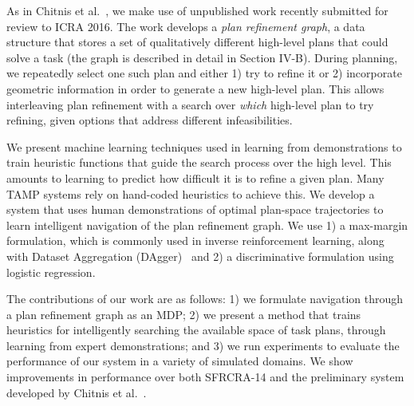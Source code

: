 As in Chitnis et al.~\cite{chitnis2015mlpc}, we make use of unpublished work
recently submitted for review to ICRA 2016. The work develops
a \emph{plan refinement graph}, a data structure that stores a
set of qualitatively different high-level plans that could solve a task (the graph is
described in detail in Section IV-B).
During planning, we repeatedly select one such plan and either 1) try to
refine it or 2) incorporate geometric information in order to generate a new high-level
plan. This allows interleaving plan refinement with a
search over \emph{which} high-level plan to try refining, given options
that address different infeasibilities.

We present machine learning techniques used in learning from demonstrations
to train heuristic functions that guide the search process over the high level.
This amounts to learning to predict how difficult it is to refine a given plan.
Many TAMP systems rely on hand-coded heuristics to achieve this. We develop a system that uses human
demonstrations of optimal plan-space trajectories to learn intelligent navigation
of the plan refinement graph. We use 1) a max-margin formulation, which is commonly used in inverse reinforcement learning, along with Dataset Aggregation (DAgger)~\cite{ross2010dagger} and 2) a discriminative formulation using logistic regression.

The contributions of our work are as follows: 1) we formulate navigation through a plan
refinement graph as an MDP; 2) we present a method that trains
heuristics for intelligently searching the available space of task plans, through learning
from expert demonstrations; and 3)
we run experiments to evaluate the performance of our system in a
variety of simulated domains. We show improvements in performance over both SFRCRA-14
and the preliminary system developed by Chitnis et al.~\cite{chitnis2015mlpc}.
